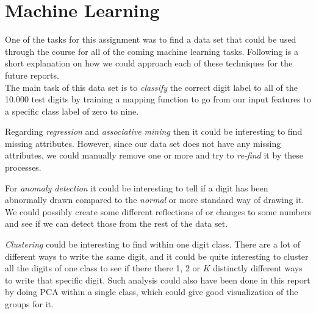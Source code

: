 \section{Machine Learning}


One of the tasks for this assignment was to find a data set that could be used through the course for all of the coming machine learning tasks. Following is a short explanation on how we could approach each of these techniques for the future reports. \\

The main task of this data set is to \emph{classify} the correct digit label to all of the 10.000 test digits by training a mapping function to go from our input features to a specific class label of zero to nine. 

Regarding \emph{regression} and \emph{associative mining} then it could be interesting to find missing attributes. However, since our data set does not have any missing attributes, we could manually remove one or more and try to \textit{re-find} it by these processes. 

For \emph{anomaly detection} it could be interesting to tell if a digit has been abnormally drawn compared to the \textit{normal} or more standard way of drawing it. We could possibly create some different reflections of or changes to some numbers and see if we can detect those from the rest of the data set. 

\emph{Clustering} could be interesting to find within one digit class. There are a lot of different ways to write the same digit, and it could be quite interesting to cluster all the digits of one class to see if there there 1, 2 or $K$ distinctly different ways to write that specific digit. Such analysis could also have been done in this report by doing PCA within a single class, which could give good visualization of the groups for it. 

